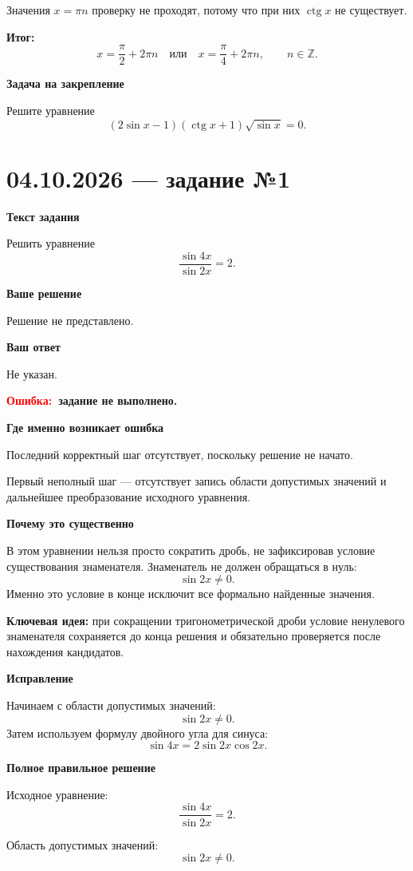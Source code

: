 \documentclass[12pt,a4paper]{article}
\newcommand{\err}{\textcolor{red}{Ошибка:}}
\newcommand{\idea}{\textcolor{blue!60!black}{Ключевая идея:}}
\newcommand{\result}{\textcolor{teal!60!black}{Итог:}}
\begin{document}
Значения \(x=\pi n\) проверку не проходят, потому что при них \(\operatorname{ctg}x\) не существует.

\textbf{\result}
\[
\boxed{
x=\frac{\pi}{2}+2\pi n
\quad\text{или}\quad
x=\frac{\pi}{4}+2\pi n,\qquad n\in\mathbb Z.
}
\]

\textbf{Задача на закрепление}

Решите уравнение
\[
(2\sin x-1)(\operatorname{ctg}x+1)\sqrt{\sin x}=0.
\]

\newpage
{}\label{task:0410-1}
\section*{04.10.2026 — задание №1}

\textbf{Текст задания}

Решить уравнение
\[
\frac{\sin 4x}{\sin 2x}=2.
\]

\textbf{Ваше решение}

Решение не представлено.

\textbf{Ваш ответ}

Не указан.

\textbf{\err\ задание не выполнено.}

\textbf{Где именно возникает ошибка}

Последний корректный шаг отсутствует, поскольку решение не начато.

Первый неполный шаг --- отсутствует запись области допустимых значений и дальнейшее преобразование исходного уравнения.

\textbf{Почему это существенно}

В этом уравнении нельзя просто сократить дробь, не зафиксировав условие существования знаменателя. Знаменатель не должен обращаться в нуль:
\[
\sin 2x\ne 0.
\]
Именно это условие в конце исключит все формально найденные значения.

\textbf{\idea} при сокращении тригонометрической дроби условие ненулевого знаменателя сохраняется до конца решения и обязательно проверяется после нахождения кандидатов.

\textbf{Исправление}

Начинаем с области допустимых значений:
\[
\sin 2x\ne 0.
\]
Затем используем формулу двойного угла для синуса:
\[
\sin 4x=2\sin 2x\cos 2x.
\]

\textbf{Полное правильное решение}

Исходное уравнение:
\[
\frac{\sin 4x}{\sin 2x}=2.
\]

Область допустимых значений:
\[
\sin 2x\ne 0.
\]
\end{document}
